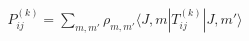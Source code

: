 \documentclass[preview]{standalone}
\begin{document}
\begin{align*}
P_{ij}^{(k)} = \sum_{m,m\prime} \rho_{m,m\prime} \langle J,m|T_{ij}^{(k)}|J,m\prime\rangle
\end{align*}
\end{document}
